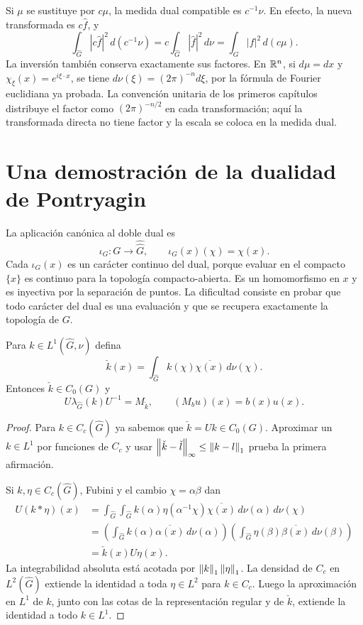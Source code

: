 \begin{observacion}[Normalizaciones]
Si $\mu$ se sustituye por $c\mu$, la medida dual compatible es $c^{-1}\nu$. En efecto, la nueva transformada es $c\widehat f$, y
\[
 \int_{\widehat G}|c\widehat f|^2\,d(c^{-1}\nu)
 =c\int_{\widehat G}|\widehat f|^2\,d\nu
 =\int_G|f|^2\,d(c\mu).
\]
La inversión también conserva exactamente sus factores. En $\mathbb R^n$, si $d\mu=dx$ y $\chi_\xi(x)=e^{i\xi\cdot x}$, se tiene $d\nu(\xi)=(2\pi)^{-n}d\xi$, por la fórmula de Fourier euclidiana ya probada. La convención unitaria de los primeros capítulos distribuye el factor como $(2\pi)^{-n/2}$ en cada transformación; aquí la transformada directa no tiene factor y la escala se coloca en la medida dual.
\end{observacion}

\section{Una demostración de la dualidad de Pontryagin}
La aplicación canónica al doble dual es
\[
 \iota_G:G\longrightarrow\widehat{\widehat G},\qquad
 \iota_G(x)(\chi)=\chi(x).
\]
Cada $\iota_G(x)$ es un carácter continuo del dual, porque evaluar en el compacto $\{x\}$ es continuo para la topología compacto-abierta. Es un homomorfismo en $x$ y es inyectiva por la separación de puntos. La dificultad consiste en probar que todo carácter del dual es una evaluación y que se recupera exactamente la topología de $G$.

\begin{lema}\label{v4:regular-dual-multiplicadores}
Para $k\in L^1(\widehat G,\nu)$ defina
\[
 \check k(x)=\int_{\widehat G}k(\chi)\overline{\chi(x)}\,d\nu(\chi).
\]
Entonces $\check k\in C_0(G)$ y
\[
 U\lambda_{\widehat G}(k)U^{-1}=M_{\check k},
 \qquad (M_bu)(x)=b(x)u(x).
\]
\end{lema}
\begin{proof}
Para $k\in C_c(\widehat G)$ ya sabemos que $\check k=Uk\in C_0(G)$. Aproximar un $k\in L^1$ por funciones de $C_c$ y usar
$\left\lVert\check k-\check l\right\rVert_\infty\le\left\lVert k-l\right\rVert_1$
prueba la primera afirmación.

Si $k,\eta\in C_c(\widehat G)$, Fubini y el cambio $\chi=\alpha\beta$ dan
\begin{align*}
 U(k*\eta)(x)
 &=\int_{\widehat G}\int_{\widehat G}
       k(\alpha)\eta(\alpha^{-1}\chi)\overline{\chi(x)}
       \,d\nu(\alpha)\,d\nu(\chi)\\
 &=\left(\int_{\widehat G}k(\alpha)\overline{\alpha(x)}\,d\nu(\alpha)\right)
   \left(\int_{\widehat G}\eta(\beta)\overline{\beta(x)}\,d\nu(\beta)\right)\\
 &=\check k(x)U\eta(x).
\end{align*}
La integrabilidad absoluta está acotada por $\left\lVert k\right\rVert_1\left\lVert\eta\right\rVert_1$. La densidad de $C_c$ en $L^2(\widehat G)$ extiende la identidad a toda $\eta\in L^2$ para $k\in C_c$. Luego la aproximación en $L^1$ de $k$, junto con las cotas de la representación regular y de $\check k$, extiende la identidad a todo $k\in L^1$.
\end{proof}

